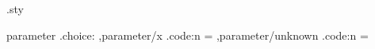 \begin{filecontents}[overwrite]{\jobname.sty}
\ProvidesFile{\@currname}

\DeclareKeys
  {
     parameter .choice:
    ,parameter/x .code:n = \xcmd
    ,parameter/unknown .code:n = \ycmd
  }

\newcommand\xcmd{\typeout{XCMD was called}}
\newcommand\ycmd{\typeout{YCMD was called}}

\ProcessKeyOptions
\end{filecontents}

\documentclass{article}

\usepackage[parameter=x,parameter=val]{\jobname}

\stop
